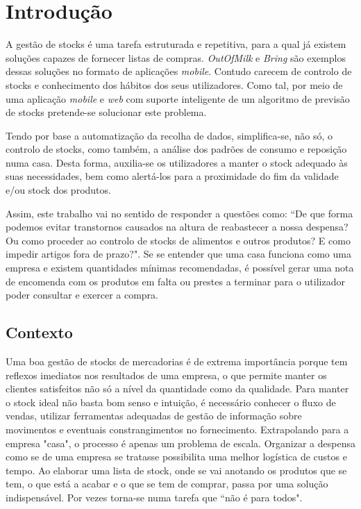%
%
\chapter{Introdução} \label{cap1}

A gestão de stocks é uma tarefa estruturada e repetitiva, para a qual já existem soluções capazes de fornecer listas de compras. \textit{OutOfMilk} e \textit{Bring} são exemplos dessas soluções no formato de aplicações \textit{mobile}. Contudo carecem de controlo de stocks e conhecimento dos hábitos dos seus utilizadores.  Como tal, por meio de uma aplicação \textit{mobile} e \textit{web} com suporte inteligente de um algoritmo de previsão de stocks pretende-se solucionar este problema.

Tendo por base a automatização da recolha de dados, simplifica-se, não só, o controlo de stocks, como também, a análise dos padrões de consumo e reposição numa casa.
Desta forma, auxilia-se os utilizadores a manter o stock adequado às suas necessidades, bem como alertá-los para a proximidade do fim da validade e/ou stock dos produtos. 

Assim, este trabalho vai no sentido de responder a questões como: ``De que forma podemos evitar transtornos causados na altura de reabastecer a nossa despensa? Ou como proceder ao controlo de stocks de alimentos e outros produtos? E como impedir artigos fora de prazo?". Se se entender que uma casa funciona como uma empresa e existem quantidades mínimas recomendadas, é possível gerar uma nota de encomenda com os produtos em falta ou prestes a terminar para o utilizador poder consultar e exercer a compra.

%
%
\section{Contexto} \label{sec11}

Uma boa gestão de stocks de mercadorias é de extrema importância porque tem reflexos imediatos nos resultados de uma empresa, o que permite manter os clientes satisfeitos não só a nível da quantidade como da qualidade. Para manter o stock ideal não basta bom senso e intuição, é necessário conhecer o fluxo de vendas, utilizar ferramentas adequadas de gestão de informação sobre movimentos e eventuais constrangimentos no fornecimento. Extrapolando para a empresa "casa", o processo é apenas um problema de escala. Organizar a despensa como se de uma empresa se tratasse possibilita uma melhor logística de custos e tempo. Ao elaborar uma lista de stock, onde se vai anotando os produtos que se tem, o que está a acabar e o que se tem de comprar, passa por uma solução indispensável. Por vezes torna-se numa tarefa que ``não é para todos".

